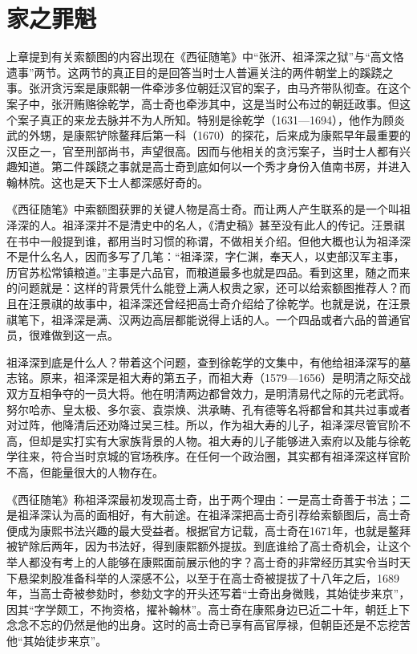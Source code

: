 \chapter{家之罪魁}

上章提到有关索额图的内容出现在《西征随笔》中“张汧、祖泽深之狱”与“高文恪遗事”两节。这两节的真正目的是回答当时士人普遍关注的两件朝堂上的蹊跷之事。张汧贪污案是康熙朝一件牵涉多位朝廷汉官的案子，由马齐带队彻查。在这个案子中，张汧贿赂徐乾学，高士奇也牵涉其中，这是当时公布过的朝廷政事。但这个案子真正的来龙去脉并不为人所知。特别是徐乾学（1631—1694），他作为顾炎武的外甥，是康熙铲除鳌拜后第一科（1670）的探花，后来成为康熙早年最重要的汉臣之一，官至刑部尚书，声望很高。因而与他相关的贪污案子，当时士人都有兴趣知道。第二件蹊跷之事就是高士奇到底如何以一个秀才身份入值南书房，并进入翰林院。这也是天下士人都深感好奇的。



《西征随笔》中索额图获罪的关键人物是高士奇。而让两人产生联系的是一个叫祖泽深的人。祖泽深并不是清史中的名人，《清史稿》甚至没有此人的传记。汪景祺在书中一般提到谁，都用当时习惯的称谓，不做相关介绍。但他大概也认为祖泽深不是什么名人，因而多写了几笔：“祖泽深，字仁渊，奉天人，以吏部汉军主事，历官苏松常镇粮道。”主事是六品官，而粮道最多也就是四品。看到这里，随之而来的问题就是：这样的背景凭什么能登上满人权贵之家，还可以给索额图推荐人？而且在汪景祺的故事中，祖泽深还曾经把高士奇介绍给了徐乾学。也就是说，在汪景祺笔下，祖泽深是满、汉两边高层都能说得上话的人。一个四品或者六品的普通官员，很难做到这一点。



祖泽深到底是什么人？带着这个问题，查到徐乾学的文集中，有他给祖泽深写的墓志铭。原来，祖泽深是祖大寿的第五子，而祖大寿（1579—1656）是明清之际交战双方互相争夺的一员大将。他在明清两边都曾效力，是明清易代之际的元老武将。努尔哈赤、皇太极、多尔衮、袁崇焕、洪承畴、孔有德等名将都曾和其共过事或者对过阵，他降清后还劝降过吴三桂。所以，作为祖大寿的儿子，祖泽深尽管官阶不高，但却是实打实有大家族背景的人物。祖大寿的儿子能够进入索府以及能与徐乾学往来，符合当时京城的官场秩序。在任何一个政治圈，其实都有祖泽深这样官阶不高，但能量很大的人物存在。



《西征随笔》称祖泽深最初发现高士奇，出于两个理由：一是高士奇善于书法；二是祖泽深认为高的面相好，有大前途。在祖泽深把高士奇引荐给索额图后，高士奇便成为康熙书法兴趣的最大受益者。根据官方记载，高士奇在1671年，也就是鳌拜被铲除后两年，因为书法好，得到康熙额外提拔。到底谁给了高士奇机会，让这个举人都没有考上的人能够在康熙面前展示他的字？高士奇的非常经历其实令当时天下悬梁刺股准备科举的人深感不公，以至于在高士奇被提拔了十八年之后，1689年，当高士奇被参劾时，参劾文字的开头还写着“士奇出身微贱，其始徒步来京”，因其“字学颇工，不拘资格，擢补翰林”。高士奇在康熙身边已近二十年，朝廷上下念念不忘的仍然是他的出身。这时的高士奇已享有高官厚禄，但朝臣还是不忘挖苦他“其始徒步来京”。


